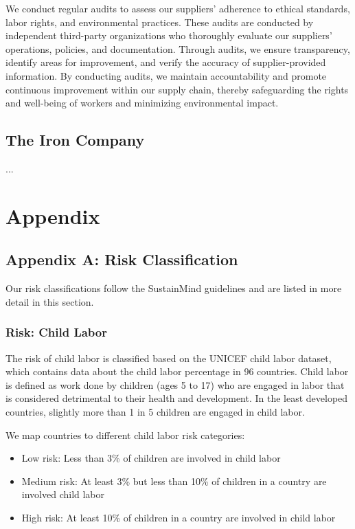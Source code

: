 \documentclass{article}
\begin{document}
We conduct regular audits to assess our suppliers' adherence to ethical standards, labor rights, and environmental practices. These audits are conducted by
independent third-party organizations who thoroughly evaluate our suppliers' operations, policies, and documentation. Through audits, we ensure transparency,
identify areas for improvement, and verify the accuracy of supplier-provided information. By conducting audits, we maintain accountability and promote continuous
improvement within our supply chain, thereby safeguarding the rights and well-being of workers and minimizing environmental impact.

\subsection{The Iron Company}

...

\section{Appendix}

\subsection{Appendix A: Risk Classification}

Our risk classifications follow the SustainMind guidelines and are listed in more detail in this section.

\subsubsection*{Risk: Child Labor}

The risk of child labor is classified based on the UNICEF child labor dataset, which contains data about the child labor percentage in 96 countries.
Child labor is defined as work done by children (ages 5 to 17) who are engaged in labor that is considered detrimental to their health and development.
In the least developed countries, slightly more than 1 in 5 children are engaged in child labor.

We map countries to different child labor risk categories:
\begin{itemize}
    \item Low risk: Less than 3\% of children are involved in child labor
    \item Medium risk: At least 3\% but less than 10\% of children in a country are involved child labor
    \item High risk: At least 10\% of children in a country are involved in child labor
\end{itemize}
\end{document}
